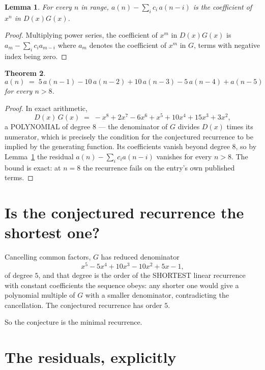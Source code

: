 \documentclass[11pt,a4paper]{article}
\theoremstyle{plain}
\newtheorem{theorem}{Theorem}
\newtheorem{lemma}[theorem]{Lemma}
\theoremstyle{definition}
\begin{document}
\begin{lemma}\label{lem:key}
For every $n$ in range, $a(n)-\sum_i c_i\,a(n-i)$ is the coefficient of $x^{n}$ in
$D(x)G(x)$.
\end{lemma}

\begin{proof}
Multiplying power series, the coefficient of $x^{m}$ in $D(x)G(x)$ is
$a_m-\sum_i c_i a_{m-i}$ where $a_m$ denotes the coefficient of $x^{m}$ in $G$, terms with
negative index being zero.
\end{proof}

\begin{theorem}
\[
a(n)\;=\;5\,a(n-1) - 10\,a(n-2) + 10\,a(n-3) - 5\,a(n-4) + a(n-5)
\]
for every $n>8$.
\end{theorem}

\begin{proof}
In exact arithmetic,
\[
D(x)\,G(x)\;=\;- x^{8} + 2 x^{7} - 6 x^{6} + x^{5} + 10 x^{4} + 15 x^{3} + 3 x^{2},
\]
a POLYNOMIAL of degree $8$ --- the denominator of $G$ divides $D(x)$ times its numerator,
which is precisely the condition for the conjectured recurrence to be implied by the
generating function. Its coefficients vanish beyond degree $8$, so by
Lemma~\ref{lem:key} the residual $a(n)-\sum_ic_ia(n-i)$ vanishes for every
$n>8$. The bound is exact: at $n=8$ the recurrence fails on the entry's own published terms.
\end{proof}

\section{Is the conjectured recurrence the shortest one?}

Cancelling common factors, $G$ has reduced denominator
\[
x^{5} - 5 x^{4} + 10 x^{3} - 10 x^{2} + 5 x - 1,
\]
of degree $5$, and that degree is the order of the SHORTEST linear recurrence with
constant coefficients the sequence obeys: any shorter one would give a polynomial multiple of
$G$ with a smaller denominator, contradicting the cancellation. The conjectured recurrence has
order $5$.

So the conjecture is the minimal recurrence.

\section{The residuals, explicitly}
\end{document}
